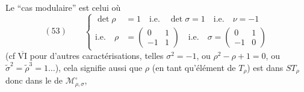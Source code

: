 Le ``cas modulaire'' est celui où
\[
(53)\qquad
\left\{\begin{aligned}
\det\rho&=1\quad\text{i.e.}\quad\det\sigma=1
\quad\text{i.e.}\quad\nu=-1\\
\text{i.e.}\quad\rho&=\begin{pmatrix}0&1\\-1&1\end{pmatrix}
\quad\text{i.e.}\quad\sigma=\begin{pmatrix}0&1\\-1&0\end{pmatrix}
\end{aligned}\right.
\]
(cf \uline{$\overline{\mathrm{VI}}$} pour d'autres
caractérisations, telles
$\sigma^2=-1$, ou $\rho^2-\rho+1=0$, ou
$\widetilde\sigma^2=\widetilde\rho^3=1\ldots$),
cela signifie aussi que $\rho$ (en tant qu'élément de $T_\rho$)
est dans $ST_\rho$ donc dans le  de $\mathcal M_{\rho,\sigma}^{\circ}$,

\par{}


